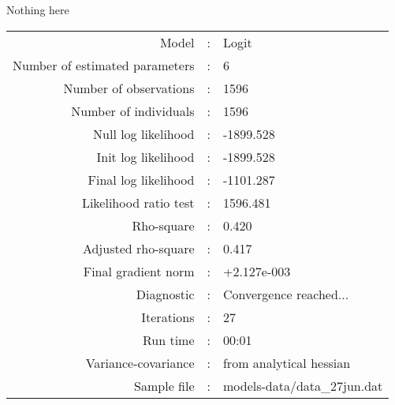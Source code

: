 Nothing here\\


\begin{flushleft}
\begin{tabular}{rcl}
\hline
Model &:& Logit\\
Number of estimated parameters&:&6\\
Number of  observations &:& 1596\\
Number of individuals&:&1596\\
Null log likelihood&:&-1899.528\\
Init log likelihood&:&-1899.528\\
Final log likelihood&:&-1101.287\\
Likelihood ratio test &:&1596.481\\
Rho-square&:&0.420\\
Adjusted rho-square&:&0.417\\
Final gradient norm&:&+2.127e-003\\
Diagnostic&:&Convergence reached...\\
Iterations&:&27\\
Run time&:&00:01\\
Variance-covariance&:&from analytical hessian
\\
Sample file&:&models-data/data_27jun.dat\\
\end{tabular}
\end{flushleft}
